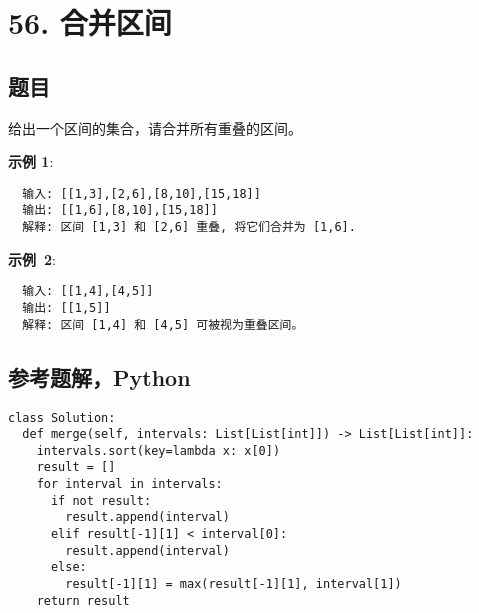 \newpage
\section{56. 合并区间}
\label{leetcode:56}

\subsection{题目}

给出一个区间的集合，请合并所有重叠的区间。

\textbf{示例 1}:

\begin{verbatim}
  输入: [[1,3],[2,6],[8,10],[15,18]]
  输出: [[1,6],[8,10],[15,18]]
  解释: 区间 [1,3] 和 [2,6] 重叠, 将它们合并为 [1,6].
\end{verbatim}

\textbf{示例 2}:

\begin{verbatim}
  输入: [[1,4],[4,5]]
  输出: [[1,5]]
  解释: 区间 [1,4] 和 [4,5] 可被视为重叠区间。
\end{verbatim}

\subsection{参考题解，Python}

\begin{verbatim}
class Solution:
  def merge(self, intervals: List[List[int]]) -> List[List[int]]:
    intervals.sort(key=lambda x: x[0])
    result = []
    for interval in intervals:
      if not result:
        result.append(interval)
      elif result[-1][1] < interval[0]:
        result.append(interval)
      else:
        result[-1][1] = max(result[-1][1], interval[1])
    return result
\end{verbatim}
